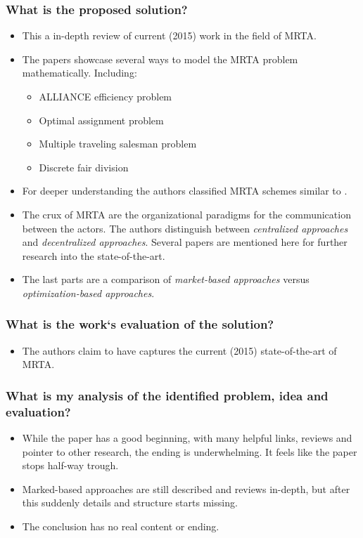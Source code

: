     \subsubsection*{What is the proposed solution?}
    \begin{itemize}
        \item This a in-depth review of current (2015) work in the field of MRTA. 
        \item The papers showcase several ways to model the MRTA problem mathematically. Including: \begin{itemize}
            \item ALLIANCE efficiency problem
            \item Optimal assignment problem
            \item Multiple traveling salesman problem
            \item Discrete fair division
        \end{itemize}
        \item For deeper understanding the authors classified MRTA schemes similar to \cite{Gerkey2004}.
        \item The crux of MRTA are the organizational paradigms for the communication between the actors. The authors distinguish between \emph{centralized approaches} and \emph{decentralized approaches}. Several papers are mentioned here for further research into the state-of-the-art.
    \item The last parts are a comparison of \emph{market-based approaches} versus \emph{optimization-based approaches}. 
    \end{itemize}
    \subsubsection*{What is the work`s evaluation of the solution?}
    \begin{itemize}
        \item The authors claim to have captures the current (2015) state-of-the-art of MRTA.
    \end{itemize}
    \subsubsection*{What is my analysis of the identified problem, idea and evaluation?}
    \begin{itemize}
        \item While the paper has a good beginning, with many helpful links, reviews and pointer to other research, the ending is underwhelming. It feels like the paper stops half-way trough. 
        \item Marked-based approaches are still described and reviews in-depth, but after this suddenly details and structure starts missing.
        \item The conclusion has no real content or ending.
    \end{itemize}

